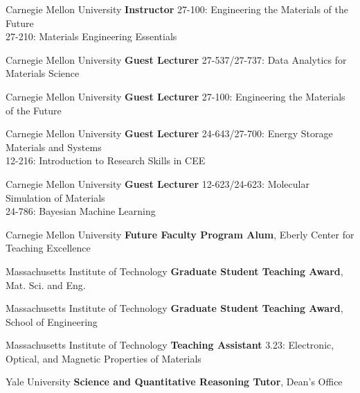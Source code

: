 \vspace{-1mm}
    {Carnegie Mellon University}
    {\textbf{Instructor}}
    {27-100: Engineering the Materials of the Future\\
    27-210: Materials Engineering Essentials}

\vspace{-2mm}
\datedsubsection{}
    {Carnegie Mellon University}
    {\textbf{Guest Lecturer}}
    {27-537/27-737: Data Analytics for Materials Science}

\vspace{-2mm}
    {Carnegie Mellon University}
    {\textbf{Guest Lecturer}}
    {27-100: Engineering the Materials of the Future}

\vspace{-2mm}
    {Carnegie Mellon University}
    {\textbf{Guest Lecturer}}
    {24-643/27-700: Energy Storage Materials and Systems\\
    12-216: Introduction to Research Skills in CEE}

\vspace{-2mm}
    {Carnegie Mellon University}
    {\textbf{Guest Lecturer}}
    {12-623/24-623: Molecular Simulation of Materials\\
    24-786: Bayesian Machine Learning}

\vspace{2.2mm}
\datedsubsectionnarrow{}
    {Carnegie Mellon University}
    {\textbf{Future Faculty Program Alum}, Eberly Center for Teaching Excellence}{}

\vspace{2.2mm}
    {Massachusetts Institute of Technology}
    {\textbf{Graduate Student Teaching Award}, Mat. Sci. and Eng.}{}

\datedsubsectionnarrow{}
    {Massachusetts Institute of Technology}
    {\textbf{Graduate Student Teaching Award}, School of Engineering}{}

\vspace{-2mm}
    {Massachusetts Institute of Technology}
    {\textbf{Teaching Assistant}}
    {3.23: Electronic, Optical, and Magnetic Properties of Materials}

\vspace{2.2mm}
    {Yale University}
    {\textbf{Science and Quantitative Reasoning Tutor}, Dean's Office}{}

